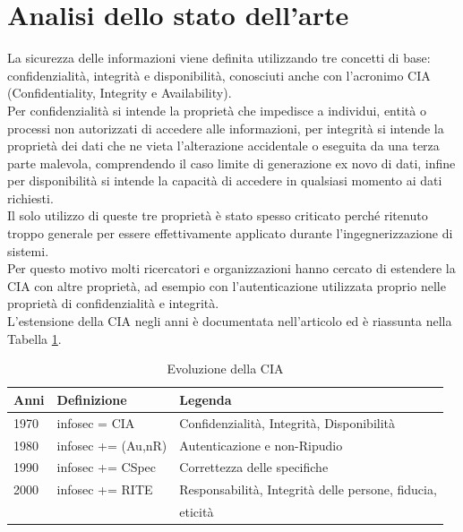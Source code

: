 \section{Analisi dello stato dell'arte}

La sicurezza delle informazioni viene definita utilizzando tre concetti di base:
confidenzialità, integrità e disponibilità, conosciuti anche con l'acronimo CIA (Confidentiality, Integrity e Availability).\\
Per confidenzialità si intende la proprietà che impedisce a individui, entità o processi non autorizzati di accedere alle informazioni, per integrità si intende la proprietà dei dati che ne vieta l'alterazione accidentale o eseguita da una terza parte malevola, comprendendo il caso limite di generazione ex novo di dati, infine per disponibilità si intende la capacità di accedere in qualsiasi momento ai dati richiesti.\\
Il solo utilizzo di queste tre proprietà è stato spesso criticato perch\'e ritenuto troppo generale per essere effettivamente applicato durante l'ingegnerizzazione di sistemi.\\
Per questo motivo molti ricercatori e organizzazioni hanno cercato di estendere la CIA con altre proprietà, ad esempio con l'autenticazione utilizzata proprio nelle proprietà di confidenzialità e integrità.\\
L'estensione della CIA negli anni è documentata nell'articolo \cite*{SC14} ed è riassunta nella Tabella \ref{tab:cia}.

\begin{table}[h!]
    \begin{tabular}{@{}lll@{}}
    \toprule
    \textbf{Anni} & \textbf{Definizione} & \textbf{Legenda}                                          \\ \midrule
    1970         & infosec = CIA        & Confidenzialità, Integrità, Disponibilità                 \\
    1980         & infosec += (Au,nR)   & Autenticazione e non-Ripudio                              \\
    1990         & infosec += CSpec     & Correttezza delle specifiche                              \\
    2000         & infosec += RITE      & Responsabilità, Integrità delle persone, fiducia, \\ 
    & & eticità\\
    \bottomrule
    \end{tabular}
    \caption{Evoluzione della CIA}
    \label{tab:cia}
    \end{table}

